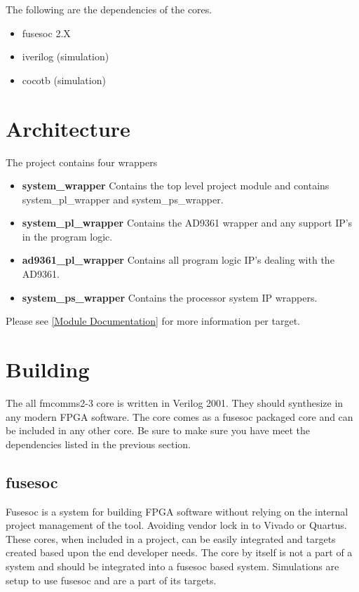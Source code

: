 \par
The following are the dependencies of the cores.

\begin{itemize}
  \item fusesoc 2.X
  \item iverilog (simulation)
  \item cocotb (simulation)
\end{itemize}



\section{Architecture}
\par
The project contains four wrappers

\begin{itemize}
  \item \textbf{system\_wrapper} Contains the top level project module and contains system\_pl\_wrapper and system\_ps\_wrapper.
  \item \textbf{system\_pl\_wrapper} Contains the AD9361 wrapper and any support IP's in the program logic.
  \item \textbf{ad9361\_pl\_wrapper} Contains all program logic IP's dealing with the AD9361.
  \item \textbf{system\_ps\_wrapper} Contains the processor system IP wrappers.
\end{itemize}

\par

Please see \ref{Module Documentation} for more information per target.

\section{Building}

\par
The all fmcomms2-3 core is written in Verilog 2001. They should synthesize in any modern FPGA software. The core comes as a fusesoc packaged core and can be
included in any other core. Be sure to make sure you have meet the dependencies listed in the previous section.

\subsection{fusesoc}
\par
Fusesoc is a system for building FPGA software without relying on the internal project management of the tool. Avoiding vendor lock in to Vivado or Quartus.
These cores, when included in a project, can be easily integrated and targets created based upon the end developer needs. The core by itself is not a part of
a system and should be integrated into a fusesoc based system. Simulations are setup to use fusesoc and are a part of its targets.

